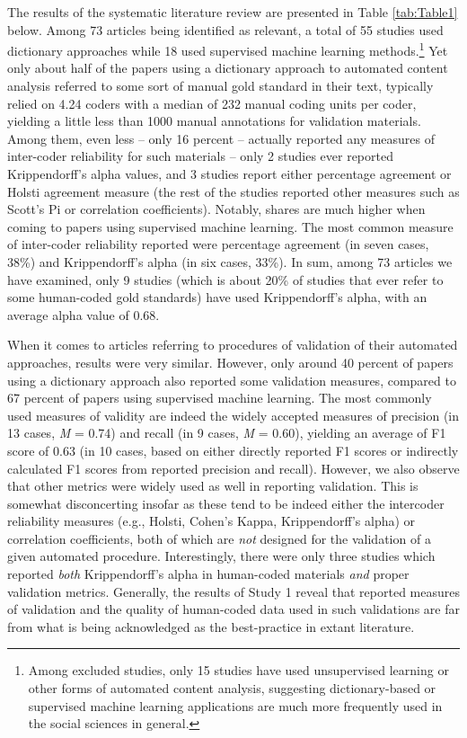 \documentclass[man, floatsintext, 12pt, a4paper, noextraspace]{apa6}
\begin{document}
    The results of the systematic literature review are presented in Table \ref{tab:Table1} below. Among 73 articles being identified as relevant, a total of 55 studies used dictionary approaches while 18 used supervised machine learning methods.\footnote{ Among excluded studies, only 15 studies have used unsupervised learning or other forms of automated content analysis, suggesting dictionary-based or supervised machine learning applications are much more frequently used in the social sciences in general.\label{fn:Study1}} Yet only about half of the papers using a dictionary approach to automated content analysis referred to some sort of manual gold standard in their text, typically relied on 4.24 coders with a median of 232 manual coding units per coder, yielding a little less than 1000 manual annotations for validation materials. Among them, even less – only 16 percent – actually reported any measures of inter-coder reliability for such materials -- only 2 studies ever reported Krippendorff’s alpha values, and 3 studies report either percentage agreement or Holsti agreement measure (the rest of the studies reported other measures such as Scott's Pi or correlation coefficients). Notably, shares are much higher when coming to papers using supervised machine learning. The most common measure of inter-coder reliability reported were percentage agreement (in seven cases, 38\%) and Krippendorff’s alpha (in six cases, 33\%). In sum, among 73 articles we have examined, only 9 studies (which is about 20\% of studies that ever refer to some human-coded gold standards) have used Krippendorff’s alpha, with an average alpha value of 0.68. 
    
    When it comes to articles referring to procedures of validation of their automated approaches, results were very similar. However, only around 40 percent of papers using a dictionary approach also reported some validation measures, compared to 67 percent of papers using supervised machine learning. The most commonly used measures of validity are indeed the widely accepted measures of precision (in 13 cases, \textit{M} = 0.74) and recall (in 9 cases, \textit{M} = 0.60), yielding an average of F1 score of 0.63 (in 10 cases, based on either directly reported F1 scores or indirectly calculated F1 scores from reported precision and recall). However, we also observe that other metrics were widely used as well in reporting validation. This is somewhat disconcerting insofar as these tend to be indeed either the intercoder reliability measures (e.g., Holsti, Cohen’s Kappa, Krippendorff’s alpha) or correlation coefficients, both of which are \textit{not} designed for the validation of a given automated procedure. Interestingly, there were only three studies which reported \textit{both} Krippendorff’s alpha in human-coded materials \textit{and} proper validation metrics. Generally, the results of Study 1 reveal that reported measures of validation and the quality of human-coded data used in such validations are far from what is being acknowledged as the best-practice in extant literature. \newline
\end{document}
